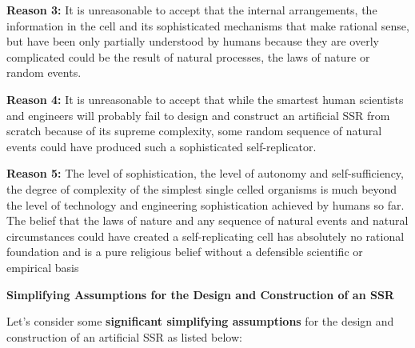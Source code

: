 \bigskip

\textbf{Reason 3: } It is unreasonable to accept that the internal
arrangements, the information in the cell and its sophisticated
mechanisms that make rational sense, but have been only partially
understood by humans because they are overly complicated could be the
result of natural processes, the laws of nature or random events.


\bigskip

\textbf{Reason 4:  }It is unreasonable to accept that while the smartest
human scientists and engineers will probably fail to design and
construct an artificial SSR from scratch because of its supreme
complexity, some random sequence of natural events could have produced
such a sophisticated self-replicator.


\bigskip

\textbf{Reason 5:} The level of sophistication, the level of autonomy
and self-sufficiency, the degree of complexity of the simplest single
celled organisms is much beyond the level of technology and engineering
sophistication achieved by humans so far. The belief that the laws of
nature and any sequence of natural events and natural circumstances
could have created a self-replicating cell has absolutely no rational
foundation and is a pure religious belief without a defensible
scientific or empirical basis


\bigskip

{\bfseries
\hypertarget{RefHeading3164306210128}{}Simplifying Assumptions for the
Design and Construction of an SSR}

Let’s consider some \textbf{significant simplifying assumptions} for the
design and construction of an artificial SSR as listed below:


\bigskip

